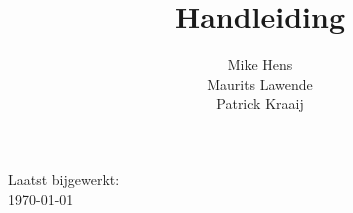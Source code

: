 \documentclass[11pt]{article}
\title{Handleiding \customerdomainuc}
\author{Mike Hens \\ Maurits Lawende \\ Patrick Kraaij}
\date{}
\begin{document}
\maketitle
\begin{center}

Laatst bijgewerkt: \\ \ddmmyyyydate \today
\end{center}
\pagebreak

\renewcommand*\contentsname{Inhoudsopgave}
\tableofcontents
\pagebreak

%







\clearpage

\appendix
\addappheadtotoc




%
\end{document}
